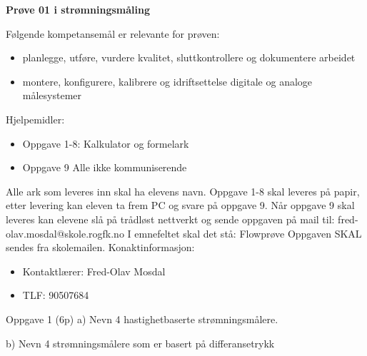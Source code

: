 
\begin{centering}
\Huge{\textbf{Prøve 01 i strømningsmåling}}\\
\end{centering}
\vskip 2cm 
Følgende kompetansemål er relevante for prøven:
\begin{itemize}[noitemsep]

	\item planlegge, utføre, vurdere kvalitet, sluttkontrollere og dokumentere arbeidet
	\item montere, konfigurere, kalibrere og idriftsettelse digitale og analoge målesystemer
\end{itemize}
\vskip 2.5pt 
Hjelpemidler:\begin{itemize}[noitemsep]
	\item Oppgave 1-8: Kalkulator og formelark
	\item Oppgave 9 Alle ikke kommuniserende
\end{itemize}

\vskip 5pt 
\vskip 10pt 
Alle ark som leveres inn skal ha elevens navn.
\vskip 2.5pt 
Oppgave 1-8 skal leveres på papir, etter levering kan eleven ta frem PC og svare på oppgave 9. 
\vskip 2.5pt 
Når oppgave 9 skal leveres kan elevene slå på trådløst nettverkt og sende oppgaven på mail til:
\vskip 2.5pt 
fred-olav.mosdal@skole.rogfk.no
\vskip 2.5pt 
I emnefeltet skal det stå: Flowprøve
\vskip 2.5pt
Oppgaven SKAL sendes fra skolemailen. 
\vskip 2cm   
Konaktinformasjon:
\begin{itemize}[noitemsep]
	\item Kontaktlærer: Fred-Olav Mosdal
	\item TLF: 90507684
\end{itemize}


\vfil \eject
Oppgave 1 (6p)%
\vskip 2.5pt 
a) Nevn 4 hastighetbaserte strømningsmålere. \\
\vskip 2.5pt 
\vskip 2.5pt 
b) Nevn 4 strømningsmålere som er basert på differansetrykk\\
\vskip 2.5pt 
\vskip 2.5pt 


